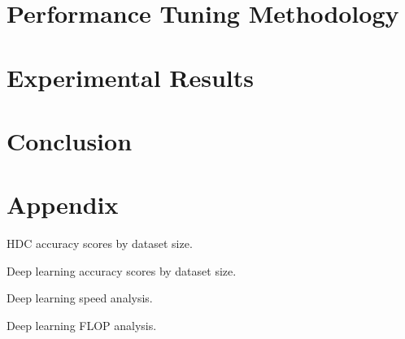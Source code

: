\documentclass[conference]{IEEEtran}
\begin{document}
\section{Performance Tuning Methodology}

\section{Experimental Results}

\section{Conclusion}

\section{Appendix}
\begin{table}[htbp]
\caption{HDC accuracy scores by dataset size.}
\begin{center}
    
\end{center}
\label{tab:hdc_acc}
\end{table}

\begin{table}[htbp]
    \caption{Deep learning accuracy scores by dataset size.}
    \begin{center}
        
    \end{center}
    \label{tab:dl_acc}
\end{table}

\begin{table}[htbp]
    \caption{Deep learning speed analysis.}
    \begin{center}
        
    \end{center}
    \label{tab:dl_speed}
\end{table}

\begin{table}[htbp]
    \caption{Deep learning FLOP analysis.}
    \begin{center}
        
    \end{center}
    \label{tab:dl_flop}
\end{table}



\end{document}
